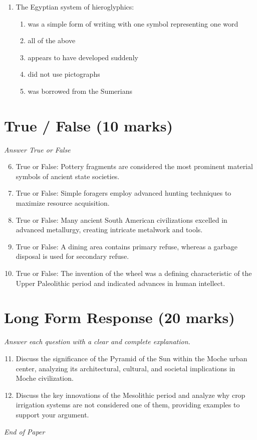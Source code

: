 \documentclass[12pt]{article}
\begin{document}
\begin{enumerate}[label=\arabic*.]
\begin{enumerate}[label=(\alph*)]
    \item Europe
    \item Africa
    \item Central America
    \item Asia
    \item None of the above
\end{enumerate}
\item The Egyptian system of hieroglyphics:
\begin{enumerate}[label=(\alph*)]
    \item was a simple form of writing with one symbol representing one word
    \item all of the above
    \item appears to have developed suddenly
    \item did not use pictographs
    \item was borrowed from the Sumerians
\end{enumerate}
\end{enumerate}

\section*{True / False (10 marks)}
\textit{Answer True or False}
\begin{enumerate}[label=\arabic*.]
\setcounter{enumi}{5}
\item True or False: Pottery fragments are considered the most prominent material symbols of ancient state societies.
\item True or False: Simple foragers employ advanced hunting techniques to maximize resource acquisition.
\item True or False: Many ancient South American civilizations excelled in advanced metallurgy, creating intricate metalwork and tools.
\item True or False: A dining area contains primary refuse, whereas a garbage disposal is used for secondary refuse.
\item True or False: The invention of the wheel was a defining characteristic of the Upper Paleolithic period and indicated advances in human intellect.
\end{enumerate}

\section*{Long Form Response (20 marks)}
\textit{Answer each question with a clear and complete explanation.}
\begin{enumerate}[label=\arabic*.]
\setcounter{enumi}{10}
\item Discuss the significance of the Pyramid of the Sun within the Moche urban center,
analyzing its architectural, cultural, and societal implications in Moche civilization.
\item Discuss the key innovations of the Mesolithic period and analyze why crop irrigation
systems are not considered one of them, providing examples to support your argument.
\end{enumerate}

\vfill
\noindent\textit{End of Paper}
\end{document}
